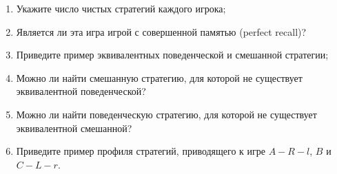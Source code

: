 \begin{problem}

\begin{enumerate}
\item Укажите число чистых стратегий каждого игрока;\par
\item Является ли эта игра игрой с совершенной памятью (perfect recall)?\par
\item  Приведите пример эквивалентных поведенческой и смешанной стратегии; \par
\item Можно ли найти смешанную стратегию, для которой не существует эквивалентной поведенческой? \par
\item Можно ли найти поведенческую стратегию, для которой не существует эквивалентной смешанной? \par
\item Приведите пример профиля стратегий, приводящего к игре  $A-R-l$,  $B$  и  $C-L-r$.
\end{enumerate}


\begin{sol}

\end{sol}
\end{problem}




